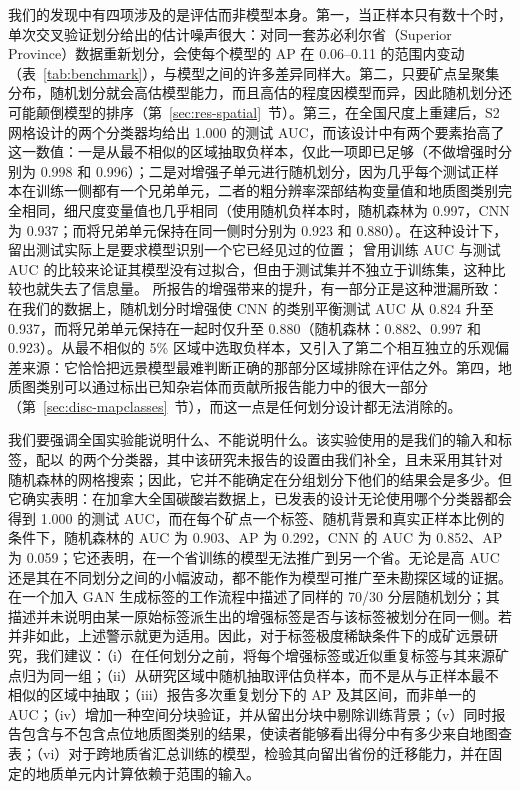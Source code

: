 \documentclass[pdflatex,sn-apa]{sn-jnl}
\begin{document}
我们的发现中有四项涉及的是评估而非模型本身。第一，当正样本只有数十个时，单次交叉验证划分给出的估计噪声很大：对同一套苏必利尔省（Superior Province）数据重新划分，会使每个模型的 AP 在 0.06--0.11 的范围内变动（表~\ref{tab:benchmark}），与模型之间的许多差异同样大。第二，只要矿点呈聚集分布，随机划分就会高估模型能力，而且高估的程度因模型而异，因此随机划分还可能颠倒模型的排序（第~\ref{sec:res-spatial}~节）。第三，在全国尺度上重建后，S2 网格设计的两个分类器均给出 1.000 的测试 AUC，而该设计中有两个要素抬高了这一数值：一是从最不相似的区域抽取负样本，仅此一项即已足够（不做增强时分别为 0.998 和 0.996）；二是对增强子单元进行随机划分，因为几乎每个测试正样本在训练一侧都有一个兄弟单元，二者的粗分辨率深部结构变量值和地质图类别完全相同，细尺度变量值也几乎相同（使用随机负样本时，随机森林为 0.997，CNN 为 0.937；而将兄弟单元保持在同一侧时分别为 0.923 和 0.880）。在这种设计下，留出测试实际上是要求模型识别一个它已经见过的位置；\citet{Parsa2024} 曾用训练 AUC 与测试 AUC 的比较来论证其模型没有过拟合，但由于测试集并不独立于训练集，这种比较也就失去了信息量。\citet{Parsa2024} 所报告的增强带来的提升，有一部分正是这种泄漏所致：在我们的数据上，随机划分时增强使 CNN 的类别平衡测试 AUC 从 0.824 升至 0.937，而将兄弟单元保持在一起时仅升至 0.880（随机森林：0.882、0.997 和 0.923）。从最不相似的 5\% 区域中选取负样本，又引入了第二个相互独立的乐观偏差来源：它恰恰把远景模型最难判断正确的那部分区域排除在评估之外。第四，地质图类别可以通过标出已知杂岩体而贡献所报告能力中的很大一部分（第~\ref{sec:disc-mapclasses}~节），而这一点是任何划分设计都无法消除的。

我们要强调全国实验能说明什么、不能说明什么。该实验使用的是我们的输入和标签，配以 \citet{Parsa2024} 的两个分类器，其中该研究未报告的设置由我们补全，且未采用其针对随机森林的网格搜索；因此，它并不能确定在分组划分下他们的结果会是多少。但它确实表明：在加拿大全国碳酸岩数据上，已发表的设计无论使用哪个分类器都会得到 1.000 的测试 AUC，而在每个矿点一个标签、随机背景和真实正样本比例的条件下，随机森林的 AUC 为 0.903、AP 为 0.292，CNN 的 AUC 为 0.852、AP 为 0.059；它还表明，在一个省训练的模型无法推广到另一个省。无论是高 AUC 还是其在不同划分之间的小幅波动，都不能作为模型可推广至未勘探区域的证据。\citet{Parsa2025} 在一个加入 GAN 生成标签的工作流程中描述了同样的 70/30 分层随机划分；其描述并未说明由某一原始标签派生出的增强标签是否与该标签被划分在同一侧。若并非如此，上述警示就更为适用。因此，对于标签极度稀缺条件下的成矿远景研究，我们建议：（i）在任何划分之前，将每个增强标签或近似重复标签与其来源矿点归为同一组；（ii）从研究区域中随机抽取评估负样本，而不是从与正样本最不相似的区域中抽取；（iii）报告多次重复划分下的 AP 及其区间，而非单一的 AUC；（iv）增加一种空间分块验证，并从留出分块中剔除训练背景；（v）同时报告包含与不包含点位地质图类别的结果，使读者能够看出得分中有多少来自地图查表；（vi）对于跨地质省汇总训练的模型，检验其向留出省份的迁移能力，并在固定的地质单元内计算依赖于范围的输入。
\end{document}
